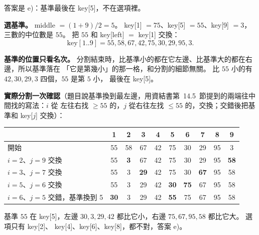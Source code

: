 \begin{pastsoln}
答案是 e)：基準最後在 key[5]，不在選項裡。

\textbf{選基準。} middle $= (1 + 9)/2 = 5$。 key[1] $= 75$、key[5] $= 55$、key[9] $= 3$，三數的中位數是
$55$。 把 $55$ 和 key[left] $=$ key[1] 交換：
\[
\text{key}[1..9] = 55, 58, 67, 42, 75, 30, 29, 95, 3 .
\]

\textbf{基準的位置只看名次。} 分割結束時，比基準小的都在它左邊、比基準大的都在右邊，所以基準落在
「它是第幾小」的那一格，和分割的細節無關。 比 $55$ 小的有 $42, 30, 29, 3$ 四個，$55$ 是第 $5$ 小，
最後在 key[5]。

\textbf{實際分割一次確認}（題目說基準換到最左邊，用資結書第~14.5~節提到的兩端往中間找的寫法：$i$ 從
左往右找 $\ge 55$ 的，$j$ 從右往左找 $\le 55$ 的，交換；交錯後把基準和 key[$j$] 交換）：
\begin{center}
\small
\begin{tabular}{l*{9}{c}}
\toprule
 & 1 & 2 & 3 & 4 & 5 & 6 & 7 & 8 & 9 \\
\midrule
開始 & 55 & 58 & 67 & 42 & 75 & 30 & 29 & 95 & 3 \\
$i = 2$、$j = 9$ 交換 & 55 & \textbf{3} & 67 & 42 & 75 & 30 & 29 & 95 & \textbf{58} \\
$i = 3$、$j = 7$ 交換 & 55 & 3 & \textbf{29} & 42 & 75 & 30 & \textbf{67} & 95 & 58 \\
$i = 5$、$j = 6$ 交換 & 55 & 3 & 29 & 42 & \textbf{30} & \textbf{75} & 67 & 95 & 58 \\
$i = 6$、$j = 5$ 交錯，基準換到 5 & \textbf{30} & 3 & 29 & 42 & \textbf{55} & 75 & 67 & 95 & 58 \\
\bottomrule
\end{tabular}
\end{center}
基準 $55$ 在 key[5]，左邊 $30, 3, 29, 42$ 都比它小，右邊 $75, 67, 95, 58$ 都比它大。 選項只有 key[2]、
key[4]、key[6]、key[8]，都不對，答案 e)。
\end{pastsoln}
